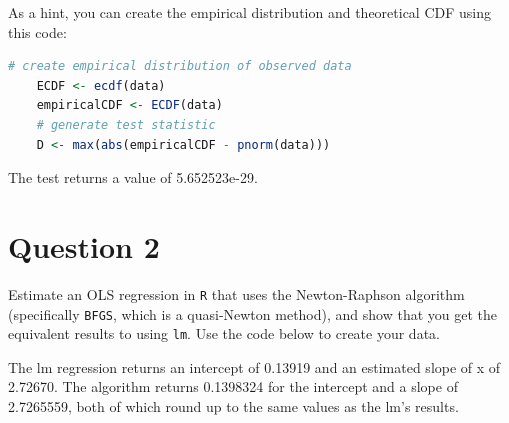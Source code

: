 \documentclass[12pt,letterpaper]{article}
\begin{document}
	
\noindent As a hint, you can create the empirical distribution and theoretical CDF using this code:

\begin{lstlisting}[language=R]
	# create empirical distribution of observed data
	ECDF <- ecdf(data)
	empiricalCDF <- ECDF(data)
	# generate test statistic
	D <- max(abs(empiricalCDF - pnorm(data))) \end{lstlisting}
	
	


The test returns a value of 5.652523e-29.

\vspace{3in}

\section*{Question 2}
\noindent Estimate an OLS regression in \texttt{R} that uses the Newton-Raphson algorithm (specifically \texttt{BFGS}, which is a quasi-Newton method), and show that you get the equivalent results to using \texttt{lm}. Use the code below to create your data.
\vspace{.5cm}
 

The lm regression returns an intercept of 0.13919 and an estimated slope of x of 2.72670.
The algorithm returns 0.1398324 for the intercept and a slope of 2.7265559, both of which round up to the same values as the lm's results.
\end{document}
